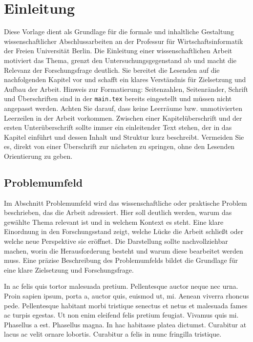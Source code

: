 \chapter{Einleitung}

Diese Vorlage dient als Grundlage für die formale und inhaltliche Gestaltung wissenschaftlicher Abschlussarbeiten an der Professur für Wirtschaftsinformatik der Freien Universität Berlin. Die Einleitung einer wissenschaftlichen Arbeit motiviert das Thema, grenzt den Untersuchungsgegenstand ab und macht die Relevanz der Forschungsfrage deutlich. Sie bereitet die Lesenden auf die nachfolgenden Kapitel vor und schafft ein klares Verständnis für Zielsetzung und Aufbau der Arbeit.
Hinweis zur Formatierung: Seitenzahlen, Seitenränder, Schrift und Überschriften sind in der \texttt{main.tex} bereits eingestellt und müssen nicht angepasst werden. Achten Sie darauf, dass keine Leerräume bzw. unmotivierten Leerzeilen in der Arbeit vorkommen.
Zwischen einer Kapitelüberschrift und der ersten Unterüberschrift sollte immer ein einleitender Text stehen, der in das Kapitel einführt und dessen Inhalt und Struktur kurz beschreibt. Vermeiden Sie es, direkt von einer Überschrift zur nächsten zu springen, ohne den Lesenden Orientierung zu geben.


\section{Problemumfeld}

Im Abschnitt \glqq{}Problemumfeld\grqq{} wird das wissenschaftliche oder praktische Problem beschrieben, das die Arbeit adressiert. Hier soll deutlich werden, warum das gewählte Thema relevant ist und in welchem Kontext es steht. Eine klare Einordnung in den Forschungsstand zeigt, welche Lücke die Arbeit schließt oder welche neue Perspektive sie eröffnet.
Die Darstellung sollte nachvollziehbar machen, worin die Herausforderung besteht und warum diese bearbeitet werden muss. Eine präzise Beschreibung des Problemumfelds bildet die Grundlage für eine klare Zielsetzung und Forschungsfrage.

In ac felis quis tortor malesuada pretium. Pellentesque auctor neque nec urna. Proin sapien ipsum, porta a, auctor quis, euismod ut, mi. Aenean viverra rhoncus pede. Pellentesque habitant morbi tristique senectus et netus et malesuada fames ac turpis egestas. Ut non enim eleifend felis pretium feugiat. Vivamus quis mi. Phasellus a est. Phasellus magna. In hac habitasse platea dictumst. Curabitur at lacus ac velit ornare lobortis. Curabitur a felis in nunc fringilla tristique. 

